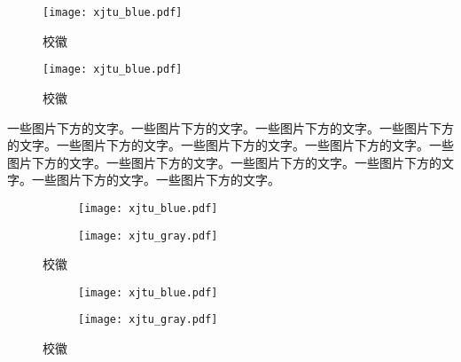 
\begin{texcodeonly}[]{}
  \begin{figure}[h]
    \centering
    \texttt{[image: xjtu\_blue.pdf]}
    \caption{校徽}
  \end{figure}
\end{texcodeonly}

\begin{figure}[h]
  \centering
  \texttt{[image: xjtu\_blue.pdf]}
  \caption{校徽}
\end{figure}

一些图片下方的文字。一些图片下方的文字。一些图片下方的文字。一些图片下方的文字。一些图片下方的文字。一些图片下方的文字。一些图片下方的文字。一些图片下方的文字。一些图片下方的文字。一些图片下方的文字。一些图片下方的文字。一些图片下方的文字。一些图片下方的文字。


\begin{texcodeonly}[]{}
  \begin{figure}[h]
    \begin{subfigure}[b]{0.49\linewidth}
        \centering
        \texttt{[image: xjtu\_blue.pdf]}
    \end{subfigure}
    \begin{subfigure}[b]{0.49\linewidth}
        \centering
        \texttt{[image: xjtu\_gray.pdf]}
        \label{subfigure:icon}
    \end{subfigure}
    \caption{校徽}
    \label{fig:icon}
  \end{figure}
\end{texcodeonly}

\begin{figure}[h]
  \begin{subfigure}[b]{0.49\linewidth}
      \centering
      \texttt{[image: xjtu\_blue.pdf]}
  \end{subfigure}
  \begin{subfigure}[b]{0.49\linewidth}
      \centering
      \texttt{[image: xjtu\_gray.pdf]}
      \label{subfigure:icon}
  \end{subfigure}
  \caption{校徽}
  \label{figure:icon}
\end{figure}

